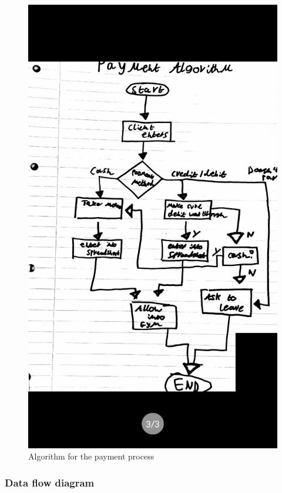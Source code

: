 \begin{figure}[H]
    \includegraphics[width=\textwidth]{PaymentAlgorithm.jpg}
    \caption{Algorithm for the payment process} \label{fig:Algorithm for the payment process}
\end{figure}

\subsubsection{Data flow diagram}

